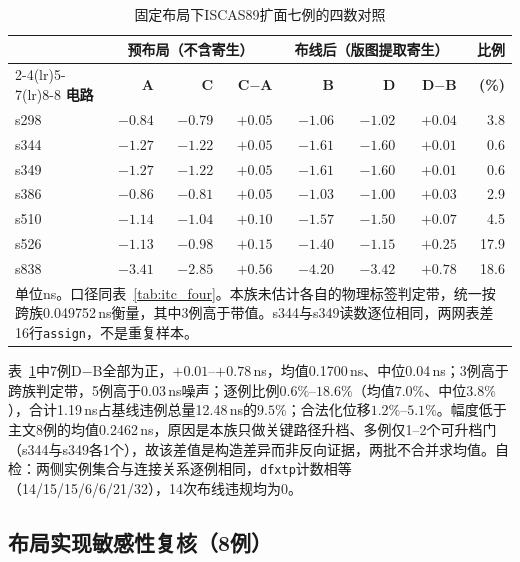 \documentclass[twocolumn,10pt,fontset=windows]{ctexart}
\begin{document}
\begin{table}[htbp]
\centering\caption{固定布局下ISCAS89扩面七例的四数对照}\label{tab:iscas_ext}
\footnotesize\setlength{\tabcolsep}{3pt}
\begin{tabular}{lrrrrrrr}
\toprule
 & \multicolumn{3}{c}{\textbf{预布局（不含寄生）}} & \multicolumn{3}{c}{\textbf{布线后（版图提取寄生）}} & \textbf{比例}\\
\cmidrule(lr){2-4}\cmidrule(lr){5-7}\cmidrule(lr){8-8}
\textbf{电路} & \textbf{A} & \textbf{C} & \textbf{C$-$A} & \textbf{B} & \textbf{D} & \textbf{D$-$B} & \textbf{(\%)}\\
\midrule
s298 & $-0.84$ & $-0.79$ & $+0.05$ & $-1.06$ & $-1.02$ & $+0.04$ & 3.8\\
s344 & $-1.27$ & $-1.22$ & $+0.05$ & $-1.61$ & $-1.60$ & $+0.01$ & 0.6\\
s349 & $-1.27$ & $-1.22$ & $+0.05$ & $-1.61$ & $-1.60$ & $+0.01$ & 0.6\\
s386 & $-0.86$ & $-0.81$ & $+0.05$ & $-1.03$ & $-1.00$ & $+0.03$ & 2.9\\
s510 & $-1.14$ & $-1.04$ & $+0.10$ & $-1.57$ & $-1.50$ & $+0.07$ & 4.5\\
s526 & $-1.13$ & $-0.98$ & $+0.15$ & $-1.40$ & $-1.15$ & $+0.25$ & 17.9\\
s838 & $-3.41$ & $-2.85$ & $+0.56$ & $-4.20$ & $-3.42$ & $+0.78$ & 18.6\\
\bottomrule
\multicolumn{8}{p{0.95\columnwidth}}{\footnotesize 单位ns。口径同表~\ref{tab:itc_four}。本族未估计各自的物理标签判定带，统一按跨族0.049752\,ns衡量，其中3例高于带值。s344与s349读数逐位相同，两网表差16行\texttt{assign}，不是重复样本。}\\
\end{tabular}
\end{table}

表~\ref{tab:iscas_ext}中7例D$-$B全部为正，$+0.01$--$+0.78$\,ns，均值0.1700\,ns、中位0.04\,ns；3例高于跨族判定带，5例高于0.03\,ns噪声；逐例比例$0.6\%$--$18.6\%$（均值$7.0\%$、中位$3.8\%$），合计1.19\,ns占基线违例总量12.48\,ns的$9.5\%$；合法化位移$1.2\%$--$5.1\%$。幅度低于主文8例的均值0.2462\,ns，原因是本族只做关键路径升档、多例仅1--2个可升档门（s344与s349各1个），故该差值是构造差异而非反向证据，两批不合并求均值。自检：两侧实例集合与连接关系逐例相同，\texttt{dfxtp}计数相等（14/15/15/6/6/21/32），14次布线违规均为0。

\subsection{布局实现敏感性复核（8例）}\label{sec:layout_stab}
\end{document}
